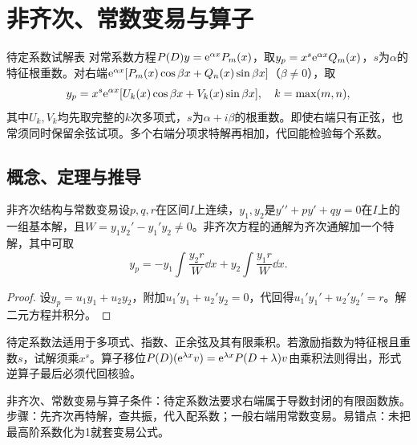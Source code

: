 \section{非齐次、常数变易与算子}\label{sec:4:4}

\begin{method}{待定系数试解表}
对常系数方程$P(D)y=\mathrm{e}^{\alpha x}P_m(x)$，取$y_p=x^s\mathrm{e}^{\alpha x}Q_m(x)$，$s$为$\alpha$的特征根重数。对右端$\mathrm{e}^{\alpha x}[P_m(x)\cos\beta x+Q_n(x)\sin\beta x]$（$\beta\ne0$），取
\[y_p=x^s\mathrm{e}^{\alpha x}[U_k(x)\cos\beta x+V_k(x)\sin\beta x],\quad k=\max(m,n),\]
其中$U_k,V_k$均先取完整的$k$次多项式，$s$为$\alpha+i\beta$的根重数。即使右端只有正弦，也常须同时保留余弦试项。多个右端分项求特解再相加，代回能检验每个系数。
\end{method}

\subsection{概念、定理与推导}

\begin{theorem}{非齐次结构与常数变易}设$p,q,r$在区间$I$上连续，$y_1,y_2$是$y\prime\prime+py\prime+qy=0$在$I$上的一组基本解，且$W=y_1y_2\prime-y_1\prime y_2\ne0$。非齐次方程的通解为齐次通解加一个特解，其中可取
\begin{equation}y_p=-y_1\int\dfrac{y_2r}{W}\dd x+y_2\int\dfrac{y_1r}{W}\dd x.\end{equation}
\end{theorem}
\begin{proof}设$y_p=u_1y_1+u_2y_2$，附加$u_1\prime y_1+u_2\prime y_2=0$，代回得$u_1\prime y_1\prime+u_2\prime y_2\prime=r$。解二元方程并积分。\end{proof}
待定系数法适用于多项式、指数、正余弦及其有限乘积。若激励指数为特征根且重数$s$，试解须乘$x^s$。算子移位$P(D)(\mathrm{e}^{\lambda x}v)=\mathrm{e}^{\lambda x}P(D+\lambda)v$由乘积法则得出，形式逆算子最后必须代回核验。

\begin{method}{非齐次、常数变易与算子}条件：待定系数法要求右端属于导数封闭的有限函数族。步骤：先齐次再特解，查共振，代入配系数；一般右端用常数变易。易错点：未把最高阶系数化为1就套变易公式。\end{method}

